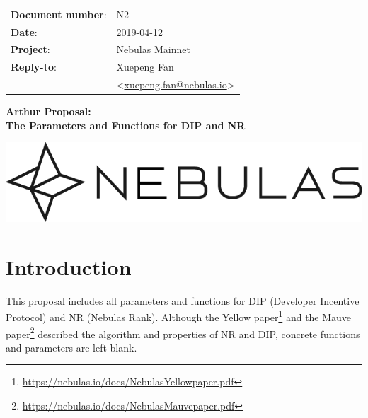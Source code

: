 \documentclass[11pt]{article}
\begin{document}
\begin{titlepage}
    \begin{center}
        \vspace*{1cm}

\begin{flushright}
  \begin{tabular}{ll}
  \textbf{Document number}:& N2 \\
  \textbf{Date}:       & 2019-04-12 \\
  \textbf{Project}:    & Nebulas Mainnet \\
  \textbf{Reply-to}:   & {Xuepeng Fan}\\
              &
              \textless\href{mailto:xuepeng.fan@nebulas.io}{xuepeng.fan@nebulas.io}\textgreater
  \end{tabular}
\end{flushright}

\vspace{2cm}
        \Huge

        \textbf{Arthur Proposal: \\The Parameters and Functions for DIP and NR}

        \vspace{0.5cm}

        \vfill
        \vspace{0.5cm}
        \includegraphics[scale=0.3]{Nebulas.png}
    \end{center}
\end{titlepage}

\section{Introduction}
This proposal includes all parameters and functions for DIP (Developer Incentive
Protocol) and NR (Nebulas Rank). Although the Yellow
paper\footnote{\url{https://nebulas.io/docs/NebulasYellowpaper.pdf}} and the
Mauve paper\footnote{\url{https://nebulas.io/docs/NebulasMauvepaper.pdf}}
described the algorithm and properties of NR and DIP, concrete functions and
parameters are left blank.
\end{document}
